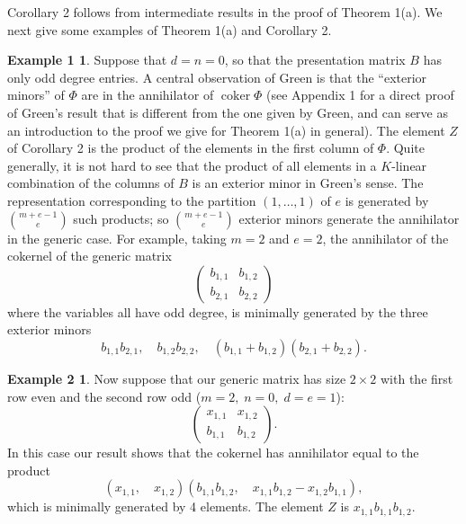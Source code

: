\documentclass{tran-l}
\theoremstyle{plain}
\theoremstyle{remark}
\theoremstyle{definition}
\newtheorem*{definition1}{Example 1}
\newtheorem*{definition2}{Example 2}
\newcommand{\coker}{\operatorname{coker}}
\begin{document}
Corollary 2 follows from intermediate results in the proof of Theorem
1(a). We next give some examples of Theorem 1(a) and Corollary 2.
\begin{definition1} Suppose that $d=n=0$, so that the presentation
matrix $B$ has only odd degree entries.
A central observation of Green \cite{Gre}
is that the ``exterior minors'' of $\Phi $ are in the annihilator of
$\coker \Phi $ (see Appendix 1 for a direct proof of
Green's result that is different from the one given by Green,
and can serve as an introduction to the proof we give for Theorem 1(a)
in general).
The element $Z$ of Corollary 2 is the product of the elements
in the first column of $\Phi $. Quite generally, it is not hard to see that the product
of all elements
in a $K$-linear combination of the columns of $B$ is an exterior
minor in Green's sense. 
The representation corresponding to the
partition $(1,\dots ,1)$ of $e$ is generated by
${\binom{m+e-1}{e}}$ such products; so 
 ${\binom{m+e-1}{e}}$ exterior
minors generate the annihilator in the generic case.
For
example, taking $m=2$ and $e=2$, the annihilator of the
cokernel of the generic matrix
\begin{equation*}
\left(\begin{matrix}
b_{1,1}&b_{1,2}\\
b_{2,1}&b_{2,2}\end{matrix}\right)
\end{equation*}
where the variables all have odd degree, 
is minimally generated by the three
exterior minors
\begin{equation*}
b_{1,1}b_{2,1},\quad b_{1,2}b_{2,2},\quad (b_{1,1}+b_{1,2})(b_{2,1}+b_{2,2}).
\end{equation*}
\end{definition1}
\begin{definition2} Now suppose that
our generic matrix has size $2\times 2$
with the first row even and the second row odd ($m=2,\; n=0,\; d=e=1$):
\begin{equation*}
\left(\begin{matrix}
x_{1,1}&x_{1,2}\\
b_{1,1}&b_{1,2}\end{matrix}\right).
\end{equation*}
In this case our result shows that the cokernel has annihilator equal
to the product
\begin{equation*}(x_{1,1},\quad x_{1,2})(b_{1,1}b_{1,2},\quad x_{1,1}b_{1,2}-x_{1,2}b_{1,1}),
\end{equation*}
which is minimally generated by 4 elements. The element $Z$ is
$x_{1,1}b_{1,1}b_{1,2}$.
\end{definition2}
\end{document}
